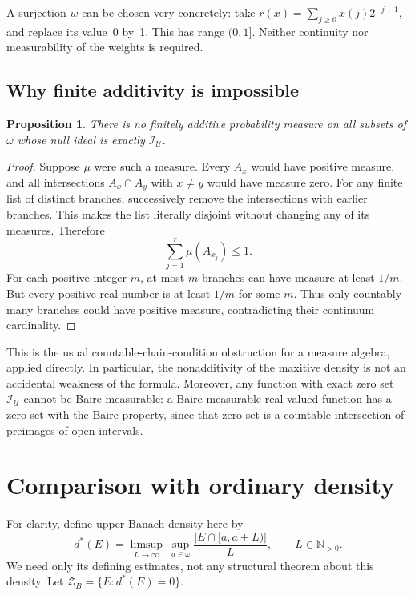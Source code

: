 \documentclass[11pt,a4paper]{article}
\newtheorem{proposition}[theorem]{Proposition}
\theoremstyle{definition}
\theoremstyle{remark}
\newcommand{\I}{\mathcal I}
\newcommand{\U}{\mathcal U}
\begin{document}
A surjection $w$ can be chosen very concretely: take
$r(x)=\sum_{j\ge0}x(j)2^{-j-1}$, and replace its value~0 by~1. This has
range $(0,1]$. Neither continuity nor measurability of the weights is
required.

\subsection{Why finite additivity is impossible}
\begin{proposition}
\label{prop:noadditive}
There is no finitely additive probability measure on all subsets of
$\omega$ whose null ideal is exactly $\I_\U$.
\end{proposition}
\begin{proof}
Suppose $\mu$ were such a measure. Every $A_x$ would have positive
measure, and all intersections $A_x\cap A_y$ with $x\ne y$ would have
measure zero. For any finite list of distinct branches, successively
remove the intersections with earlier branches. This makes the list
literally disjoint without changing any of its measures. Therefore
\[
                       \sum_{j=1}^r\mu(A_{x_j})\le1.
\]
For each positive integer $m$, at most $m$ branches can have measure
at least $1/m$. But every positive real number is at least $1/m$ for
some $m$. Thus only countably many branches could have positive
measure, contradicting their continuum cardinality.
\end{proof}

This is the usual countable-chain-condition obstruction for a measure
algebra, applied directly. In particular, the nonadditivity of the
maxitive density is not an accidental weakness of the formula.
Moreover, any function with exact zero set $\I_\U$ cannot be Baire
measurable: a Baire-measurable real-valued function has a zero set with
the Baire property, since that zero set is a countable intersection of
preimages of open intervals.

\section{Comparison with ordinary density}
\label{sec:banach}

For clarity, define upper Banach density here by
\[
 d^*(E)=\limsup_{L\to\infty}\ \sup_{a\in\omega}
                   \frac{|E\cap[a,a+L)|}{L},
              \qquad L\in\mathbb N_{>0}.
\]
We need only its defining estimates, not any structural theorem about
this density. Let $\mathcal Z_B=\{E:d^*(E)=0\}$.
\end{document}
